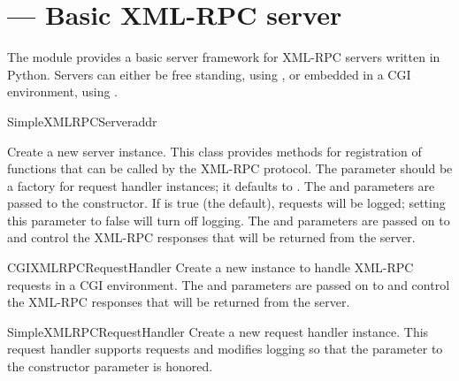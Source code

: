 \section{ ---
         Basic XML-RPC server}



The  module provides a basic server
framework for XML-RPC servers written in Python.  Servers can either
be free standing, using , or embedded in a
CGI environment, using .

\begin{classdesc}{SimpleXMLRPCServer}{addr}

  Create a new server instance.  This class
  provides methods for registration of functions that can be called by
  the XML-RPC protocol.  The  parameter
  should be a factory for request handler instances; it defaults to
  .  The  and
   parameters are passed to the
   constructor.  If
   is true (the default), requests will be logged;
  setting this parameter to false will turn off logging.  
  The  and  parameters are passed on to 
   and control the XML-RPC responses that will be returned 
  from the server.
\end{classdesc}

\begin{classdesc}{CGIXMLRPCRequestHandler}{}
  Create a new instance to handle XML-RPC requests in a CGI
  environment. 
  The  and  parameters are passed on to 
   and control the XML-RPC responses that will be returned 
  from the server.
\end{classdesc}

\begin{classdesc}{SimpleXMLRPCRequestHandler}{}
  Create a new request handler instance.  This request handler
  supports  requests and modifies logging so that the
   parameter to the 
  constructor parameter is honored.
\end{classdesc}


